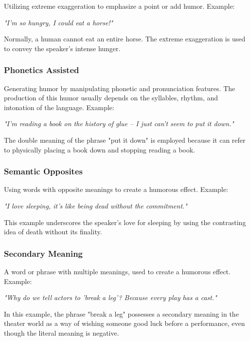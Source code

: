 \documentclass[a4paper]{article}
\begin{document}
Utilizing extreme exaggeration to emphasize a point or add humor. Example:

\subitem\textit{"I'm so hungry, I could eat a horse!"}

Normally, a human cannot eat an entire horse. The extreme exaggeration is used to convey the speaker's intense hunger.

\subsubsection {\bf Phonetics Assisted}

Generating humor by manipulating phonetic and pronunciation features. The production of this humor usually depends on the syllables, rhythm, and intonation of the language. Example:

\subitem\textit{"I'm reading a book on the history of glue – I just can't seem to put it down."}

The double meaning of the phrase "put it down" is employed because it can refer to physically placing a book down and stopping reading a book.
    
\subsubsection{\bf Semantic Opposites}

Using words with opposite meanings to create a humorous effect. Example:

\subitem\textit{"I love sleeping, it's like being dead without the commitment."}

This example underscores the speaker's love for sleeping by using the contrasting idea of death without its finality.

\subsubsection{\bf Secondary Meaning}

A word or phrase with multiple meanings, used to create a humorous effect. Example:

\subitem\textit{"Why do we tell actors to 'break a leg'? Because every play has a cast."}

In this example, the phrase "break a leg" possesses a secondary meaning in the theater world as a way of wishing someone good luck before a performance, even though the literal meaning is negative.

\end{document}

